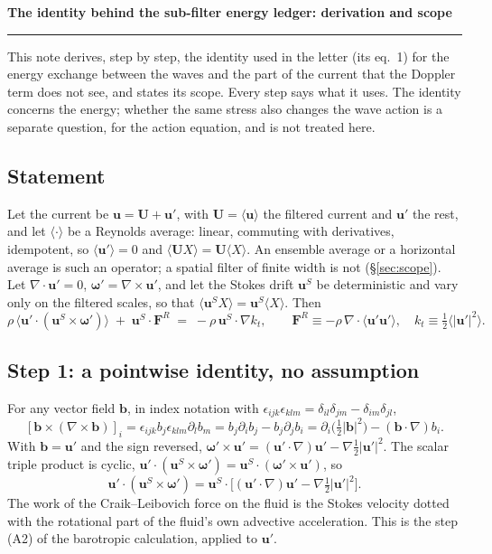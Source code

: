 \documentclass[10pt]{article}
\newcommand{\av}[1]{\langle #1\rangle}\newcommand{\uS}{\bm u^S}\newcommand{\WS}{\mathcal W_S}\newcommand{\PS}{\mathcal P_S}
\newcommand{\bu}{\bm u}\newcommand{\bU}{\bm U}\newcommand{\bxi}{\bm\xi}\newcommand{\dd}{\mathrm d}
\begin{document}
\begin{center}{\large\bfseries The identity behind the sub-filter energy ledger: derivation and scope}\\[2pt]
\end{center}
\vspace{-2pt}\rule{\textwidth}{0.4pt}
This note derives, step by step, the identity used in the letter (its eq.~1) for the energy exchange between the waves and the part of the current that the Doppler term does not see, and states its scope. Every step says what it uses. The identity concerns the energy; whether the same stress also changes the wave action is a separate question, for the action equation, and is not treated here.

\subsection{Statement}
Let the current be $\bu=\bU+\bu'$, with $\bU=\av{\bu}$ the filtered current and $\bu'$ the rest, and let $\av\cdot$ be a Reynolds average: linear, commuting with derivatives, idempotent, so $\av{\bu'}=0$ and $\av{\bU X}=\bU\av X$. An ensemble average or a horizontal average is such an operator; a spatial filter of finite width is not (\S\ref{sec:scope}). Let $\nabla\cdot\bu'=0$, $\bm\omega'=\nabla\times\bu'$, and let the Stokes drift $\uS$ be deterministic and vary only on the filtered scales, so that $\av{\uS X}=\uS\av X$. Then
\begin{equation}
\rho\,\av{\bu'\cdot(\uS\times\bm\omega')}\;+\;\uS\!\cdot\bm F^R\;=\;-\rho\,\uS\!\cdot\nabla k_t,
\qquad \bm F^R\equiv-\rho\,\nabla\cdot\av{\bu'\bu'},\quad k_t\equiv\tfrac12\av{|\bu'|^2}.
\tag{1}\label{eq:id}
\end{equation}
\setcounter{equation}{1}

\subsection{Step 1: a pointwise identity, no assumption}
For any vector field $\bm b$, in index notation with $\epsilon_{ijk}\epsilon_{klm}=\delta_{il}\delta_{jm}-\delta_{im}\delta_{jl}$,
\[
[\bm b\times(\nabla\times\bm b)]_i=\epsilon_{ijk}b_j\epsilon_{klm}\partial_lb_m=b_j\partial_ib_j-b_j\partial_jb_i
=\partial_i\big(\tfrac12|\bm b|^2\big)-(\bm b\cdot\nabla)b_i .
\]
With $\bm b=\bu'$ and the sign reversed, $\bm\omega'\times\bu'=(\bu'\cdot\nabla)\bu'-\nabla\tfrac12|\bu'|^2$. The scalar triple product is cyclic, $\bu'\cdot(\uS\times\bm\omega')=\uS\cdot(\bm\omega'\times\bu')$, so
\begin{equation}
\bu'\cdot(\uS\times\bm\omega')=\uS\cdot\big[(\bu'\cdot\nabla)\bu'-\nabla\tfrac12|\bu'|^2\big].
\label{eq:s1}
\end{equation}
The work of the Craik--Leibovich force on the fluid is the Stokes velocity dotted with the rotational part of the fluid's own advective acceleration. This is the step (A2) of the barotropic calculation, applied to $\bu'$.
\end{document}
